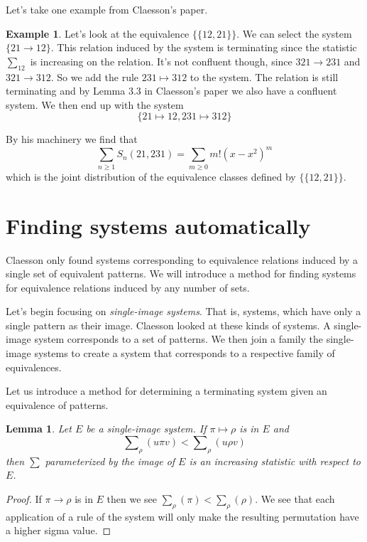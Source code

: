 \documentclass[a4paper, 11pt, english]{article}
\newcommand{\breath}{\vspace{6pt plus 2pt minus 1pt}\noindent}
\newcommand{\patternrule}{ \mapsto \!}
\newtheorem{lemma}[theorem]{Lemma}
\theoremstyle{definition}
\newtheorem{example}[theorem]{Example}
\newcommand{\Sym}{S}
\begin{document}
Let's take one example from Claesson's paper.
\begin{example}
    Let's look at the equivalence $\{ \{ 12, 21 \} \}$. We can select the system $\{
        21 \to 12 \}$. This relation induced by the system is terminating since the statistic
    $\sum_{12}$ is increasing on the relation. It's not
    confluent though, since $321 \to 231$ and $321 \to 312$. So we add the rule
    $231 \patternrule 312$ to the system. The relation is still terminating and by Lemma
    3.3 in Claesson's paper we also have a confluent system. We then end up with
    the system 
    \[
        \{ 21 \patternrule 12, 231 \patternrule 312 \}
    \]

    \breath

    By his machinery we find that 
    \[
        \sum_{n \geq 1} \Sym_n(21, 231) = \sum_{m \geq 0} m!(x-x^2)^m
    \]
    which is the joint distribution of the equivalence classes defined by 
    $\{ \{ 12, 21 \} \}$.
\end{example}

\section{Finding systems automatically}
Claesson only found systems corresponding to equivalence relations induced by a
single set of equivalent patterns. We will introduce a method for finding
systems for equivalence relations induced by any number of sets.

Let's begin focusing on \emph{single-image systems}. That is, systems, which
have only a single pattern as their image. Claesson looked at these kinds
of systems. A single-image system corresponds to a set of patterns.
We then join a family the single-image systems to
create a system that corresponds to a respective family of equivalences.

Let us introduce a method for determining a terminating system given an
equivalence of patterns.

\begin{lemma}
    Let $E$ be a single-image system. If $\pi \patternrule \rho$ is in $E$ and 
    \[
        \sum\nolimits_\rho(u\pi v) < \sum\nolimits_\rho(u \rho v) \tag{$\ast$}
        \label{increasingimage}
    \]
    then $\sum$ parameterized by the image of $E$ is an increasing statistic
    with respect to $E$.
\end{lemma}
\begin{proof}
    If $\pi \to \rho$ is in $E$ then we see $\sum_\rho(\pi) <
    \sum_\rho(\rho)$.  We see that each application of a rule of the system
    will only make the resulting permutation have a higher sigma value.
\end{proof}
\end{document}
